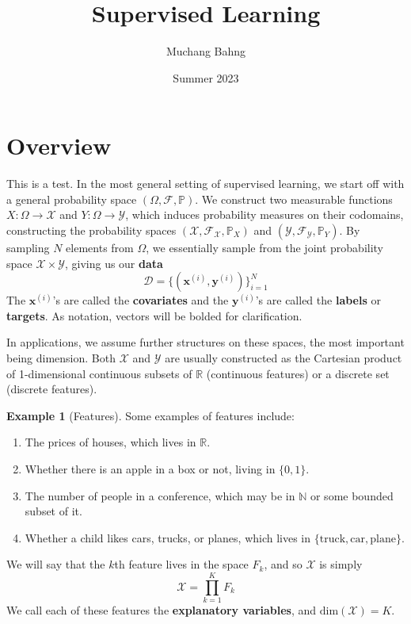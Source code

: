 \documentclass{article}
\theoremstyle{definition}
\newtheorem{example}{Example}[section]
\theoremstyle{remark}
\theoremstyle{definition}
\begin{document}
\pagestyle{fancy}

\cfoot{\thepage / \pageref{LastPage}}

\title{Supervised Learning}
\author{Muchang Bahng}
\date{Summer 2023}

\maketitle

\tableofcontents

\pagebreak 

\section{Overview}


This is a test. 
In the most general setting of supervised learning, we start off with a general probability space $(\Omega, \mathcal{F}, \mathbb{P})$. We construct two measurable functions $X: \Omega \rightarrow \mathcal{X}$ and $Y: \Omega \rightarrow \mathcal{Y}$, which induces probability measures on their codomains, constructing the probability spaces $(\mathcal{X}, \mathcal{F}_{\mathcal{X}}, \mathbb{P}_X)$ and $(\mathcal{Y}, \mathcal{F}_{\mathcal{Y}}, \mathbb{P}_Y)$. By sampling $N$ elements from $\Omega$, we essentially sample from the joint probability space $\mathcal{X} \times \mathcal{Y}$, giving us our \textbf{data} 
\[\mathcal{D} = \{(\mathbf{x}^{(i)}, \mathbf{y}^{(i)}) \}_{i=1}^N\]
The $\mathbf{x}^{(i)}$'s are called the \textbf{covariates} and the $\mathbf{y}^{(i)}$'s are called the \textbf{labels} or \textbf{targets}. As notation, vectors will be bolded for clarification. 

In applications, we assume further structures on these spaces, the most important being dimension. Both $\mathcal{X}$ and $\mathcal{Y}$ are usually constructed as the Cartesian product of 1-dimensional continuous subsets of $\mathbb{R}$ (continuous features) or a discrete set (discrete features). 

\begin{example}[Features]
Some examples of features include: 
\begin{enumerate}
    \item The prices of houses, which lives in $\mathbb{R}$. 
    \item Whether there is an apple in a box or not, living in $\{0, 1\}$. 
    \item The number of people in a conference, which may be in $\mathbb{N}$ or some bounded subset of it. 
    \item Whether a child likes cars, trucks, or planes, which lives in $\{\text{truck}, \text{car}, \text{plane}\}$. 
\end{enumerate}
\end{example}
We will say that the $k$th feature lives in the space $F_k$, and so $\mathcal{X}$ is simply 
\[\mathcal{X} = \prod_{k=1}^K  F_k\]
We call each of these features the \textbf{explanatory variables}, and $\mathrm{dim}(\mathcal{X}) = K$. 
\end{document}
